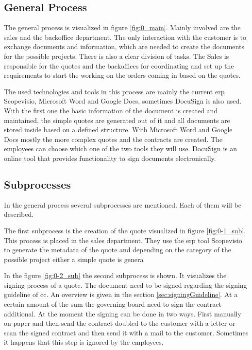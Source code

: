 \subsection{General Process}
The general process is visualized in figure \ref{fig:0_main}. Mainly involved are the sales and the backoffice department. The only interaction with the customer is to exchange documents and information, which are needed to create the documents for the possible projects. There is also a clear division of tasks. The Sales is responsible for the quotes and the backoffices for coordinating and set up the requirements to start the working on the orders coming in based on the quotes.

The used technologies and tools in this process are mainly the current \gls{erp} Scopevisio, Microsoft Word and Google Docs, sometimes DocuSign is also used. With the first one the basic information of the document is created and maintained, the simple quotes are generated out of it and all documents are stored inside based on a defined structure. With Microsoft Word and Google Docs mostly the more complex quotes and the contracts are created. The employees can choose which one of the two tools they will use. DocuSign is an online tool that provides functionality to sign documents electronically.

\subsection{Subprocesses}
In the general process several subprocesses are mentioned. Each of them will be described.

The first subprocess is the creation of the quote visualized in figure \ref{fig:0-1_sub}. This process is placed in the sales department. They use the \gls{erp} tool Scopevisio to generate the metadata of the quote and depending on the category of the possible project either a simple quote is genera

In the figure \ref{fig:0-2_sub} the second subprocess is shown. It visualizes the signing process of a quote. The document need to be signed regarding the signing guideline of \gls{cc}. An overview is given in the section \ref{sec:signingGuideline}. At a certain amount of the sum the governing board need to sign the contract additional. At the moment the signing can be done in two ways. First manually on paper and then send the contract doubled to the customer with a letter or scan the signed contract and then send it with a mail to the customer. Sometimes it happens that this step is ignored by the employees.

